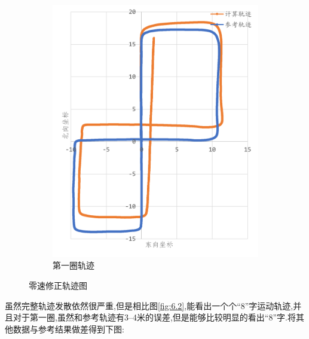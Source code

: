 \documentclass[10pt,a4paper]{ctexart}
\begin{document}
\begin{figure}[H]
{\begin{subfigure}{0.49\textwidth}
            \includegraphics[width=\linewidth]{Figures/DataFigure/灵素修正第一圈轨迹.png}
            \caption{第一圈轨迹}
        \end{subfigure}
    }
    \caption{零速修正轨迹图}
    \label{fig:6.4}
\end{figure}
\noindent 虽然完整轨迹发散依然很严重,但是相比图\ref{fig:6.2},能看出一个个``8''字运动轨迹,并且对于第一圈,虽然和参考轨迹有3--4米的误差,但是能够比较明显的看出``8''字.将其他数据与参考结果做差得到下图:
\end{document}
